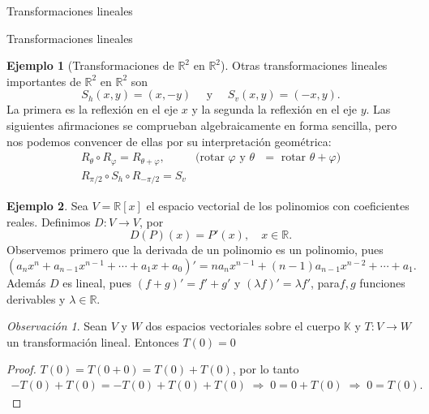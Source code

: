 \documentclass[a4paper,12pt,twoside,spanish,reqno]{amsbook}
\theoremstyle{definition}
\newtheorem{ejemplo}{Ejemplo}[section]
\theoremstyle{remark}
\newtheorem{obs}{Observaci\'on}[section]
\newcommand{\R}{\mathbb R}
\newcommand{\K}{\mathbb K}
\begin{document}
\begin{chapter}{Transformaciones lineales}
\begin{section}{Transformaciones lineales}
\begin{ejemplo}[Transformaciones de $\R^2$ en $\R^2$]
                
                
                Otras transformaciones lineales importantes de $\R^2$ en $\R^2$ son 
                $$
                S_h(x,y) = (x,-y) \quad \text{ y } \quad S_v(x,y) = (-x,y).
                $$
                La primera es la reflexión en el eje $x$ y la segunda la reflexión en el eje $y$. Las siguientes afirmaciones se comprueban algebraicamente en forma sencilla, pero nos podemos convencer de ellas por su interpretación geométrica:
                \begin{equation*}
                \begin{array}{ll}
                R_\theta \circ R_\varphi = R_{\theta +\varphi}, \quad &\text{(rotar $\varphi$ y $\theta$ $=$  rotar $\theta+\varphi$)} \\
                R_{\pi/2} \circ S_h \circ R_{-\pi/2} = S_v&
                \end{array}
                \end{equation*}
                
            \end{ejemplo}
    
        
            \begin{ejemplo}
            Sea $V = \R[x]$ el espacio vectorial de los polinomios con coeficientes reales. Definimos $D:V \to V$, por
            $$
            D(P)(x) = P'(x),\quad x \in \R. 
            $$
            Observemos primero que la derivada de un polinomio es un polinomio, pues 
            $$
            (a_nx^n+ a_{n-1}x^{n-1}+\cdots + a_1 x + a_0)' = na_nx^{n-1}+ (n-1)a_{n-1}x^{n-2}+\cdots + a_1.
            $$
            Además  $D$  es lineal, pues $(f+g)' = f' + g'$ y $(\lambda f)' = \lambda f'$, para$f,g$ funciones derivables y $\lambda \in \R$.
            \end{ejemplo} 
        
        \begin{obs}	Sean $V$ y $W$ dos espacios vectoriales sobre el cuerpo $\K$ y 	 $T:V \to W$			un transformación lineal. Entonces $T(0) =0$
        \end{obs}
        \begin{proof} $T(0) = T(0+0) = T(0) + T(0)$, por lo tanto 
            \begin{align*}
                -T(0) + T(0) = -T(0) + T(0)+T(0) \;\Rightarrow\; 0 = 0 +T(0) \;\Rightarrow\; 0= T(0).
            \end{align*}
        \end{proof}
        

\end{section}
\end{chapter}
\end{document}
